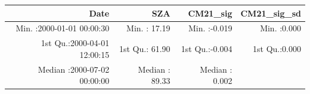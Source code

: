 \documentclass[
  10pt,
  a4paper,oneside]{article}
\begin{document}
\begin{longtable}[]{@{}rrrr@{}}
\toprule
\begin{minipage}[b]{0.33\columnwidth}\raggedleft
Date\strut
\end{minipage} & \begin{minipage}[b]{0.19\columnwidth}\raggedleft
SZA\strut
\end{minipage} & \begin{minipage}[b]{0.19\columnwidth}\raggedleft
CM21\_sig\strut
\end{minipage} & \begin{minipage}[b]{0.19\columnwidth}\raggedleft
CM21\_sig\_sd\strut
\end{minipage}\tabularnewline
\midrule
\endhead
\begin{minipage}[t]{0.33\columnwidth}\raggedleft
Min. :2000-01-01 00:00:30\strut
\end{minipage} & \begin{minipage}[t]{0.19\columnwidth}\raggedleft
Min. : 17.19\strut
\end{minipage} & \begin{minipage}[t]{0.19\columnwidth}\raggedleft
Min. :-0.019\strut
\end{minipage} & \begin{minipage}[t]{0.19\columnwidth}\raggedleft
Min. :0.000\strut
\end{minipage}\tabularnewline
\begin{minipage}[t]{0.33\columnwidth}\raggedleft
1st Qu.:2000-04-01 12:00:15\strut
\end{minipage} & \begin{minipage}[t]{0.19\columnwidth}\raggedleft
1st Qu.: 61.90\strut
\end{minipage} & \begin{minipage}[t]{0.19\columnwidth}\raggedleft
1st Qu.:-0.004\strut
\end{minipage} & \begin{minipage}[t]{0.19\columnwidth}\raggedleft
1st Qu.:0.000\strut
\end{minipage}\tabularnewline
\begin{minipage}[t]{0.33\columnwidth}\raggedleft
Median :2000-07-02 00:00:00\strut
\end{minipage} & \begin{minipage}[t]{0.19\columnwidth}\raggedleft
Median : 89.33\strut
\end{minipage} & \begin{minipage}[t]{0.19\columnwidth}\raggedleft
Median : 0.002\strut
\end{minipage} & \begin{minipage}[t]{0.19\columnwidth}\raggedleft

\end{minipage}
\end{longtable}
\end{document}
